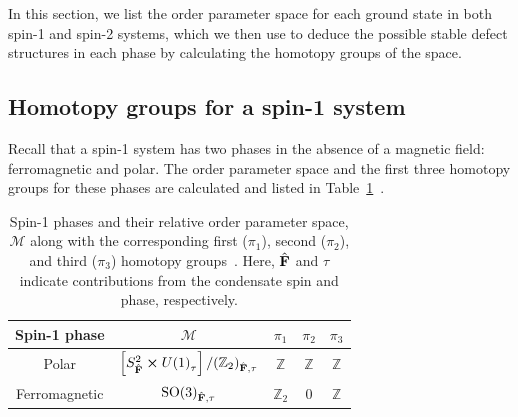 In this section, we list the order parameter space for each ground state
in both spin-1 and spin-2 systems, which we then use to deduce the possible
stable defect structures in each phase by calculating the homotopy groups of the
space.

\subsection{Homotopy groups for a spin-1 system}
Recall that a spin-1 system has two phases in the absence of a magnetic field:
ferromagnetic and polar.
The order parameter space and the first three homotopy groups for these phases
are calculated and listed in
Table~\ref{tab: spin-1-homotopy-groups}~\cite{Mermin1979,Kawaguchi2012,
Kobayashi2012}.
\begin{table}
    \centering
    \begin{tabular}{ccccc}
        \toprule
        Spin-1 phase & \(\mathcal{M}\) & \(\pi_1\) & \(\pi_2\) & \(\pi_3\) \\
        \midrule
        Polar & \(\left[S^2_{\hat{\vb{F}}} \cross {U(1)}_\tau\right]
        / {({\mathbb{Z}}_2)}_{\hat{\vb{F}}, \tau} \)
        & \(\mathbb{Z}\) & \(\mathbb{Z}\)  & \(\mathbb{Z}\) \\
        Ferromagnetic & \({\text{SO}(3)}_{\hat{\vb{F}}, \tau}\)
        & \({\mathbb{Z}}_2\) & 0  & \(\mathbb{Z}\) \\
        \bottomrule
    \end{tabular}
    \caption[Order parameter spaces and first three homotopy groups for spin-1
    BECs]{\label{tab: spin-1-homotopy-groups}Spin-1 phases and their relative
    order parameter space, \(\mathcal{M}\) along with the corresponding first
    (\(\pi_1\)), second (\(\pi_2\)), and third (\(\pi_3\)) homotopy
    groups~\cite{Kobayashi2012}.
    Here, \(\hat{\vb{F}}\) and \(\tau \) indicate contributions from the
    condensate spin and phase, respectively.}
\end{table}

